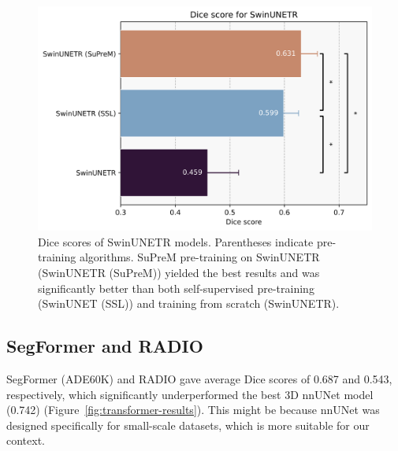 \documentclass[a4paper,11pt,oneside]{report}
\begin{document}
\begin{figure}[hbt]
    \centering
    \includegraphics[width=0.5\linewidth]{figures/result_SwinUNETR_results.png}
    \caption{Dice scores of SwinUNETR models. Parentheses indicate pre-training algorithms. SuPreM pre-training on SwinUNETR (SwinUNETR (SuPreM)) yielded the best results and was significantly better than both self-supervised pre-training (SwinUNET (SSL)) and training from scratch (SwinUNETR).}
    \label{fig:suprem-results}
\end{figure}


\subsection{SegFormer and RADIO}
SegFormer (ADE60K) and RADIO gave average Dice scores of 0.687 and 0.543, respectively, which significantly underperformed the best 3D nnUNet model (0.742) (Figure~\ref{fig:transformer-results}). This might be because nnUNet was designed specifically for small-scale datasets, which is more suitable for our context.
\end{document}
